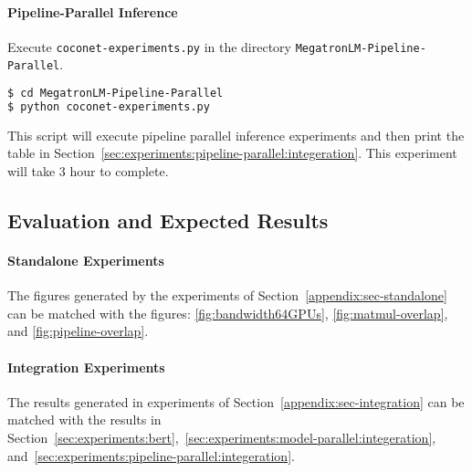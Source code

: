 \paragraph{Pipeline-Parallel Inference} 
Execute \texttt{coconet-experiments.py} in the directory
\texttt{MegatronLM-Pipeline-Parallel}.
{\footnotesize
\begin{lstlisting}[language=bash]
$ cd MegatronLM-Pipeline-Parallel
$ python coconet-experiments.py
\end{lstlisting}
}
This script will execute pipeline parallel inference experiments and then print the table in Section~\ref{sec:experiments:pipeline-parallel:integeration}.
This experiment will take 3 hour to complete.
\subsection{Evaluation and Expected Results}

\paragraph{Standalone Experiments} The figures generated by the experiments of Section~\ref{appendix:sec-standalone} can be matched with the figures: \ref{fig:bandwidth64GPUs}, \ref{fig:matmul-overlap}, and \ref{fig:pipeline-overlap}.

\paragraph{Integration Experiments}
The results generated in experiments of Section~\ref{appendix:sec-integration} can be matched with the results in Section~\ref{sec:experiments:bert},~\ref{sec:experiments:model-parallel:integeration}, and~\ref{sec:experiments:pipeline-parallel:integeration}.



